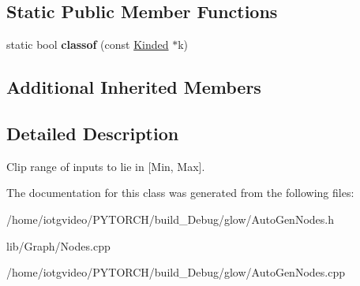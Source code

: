 \subsection*{Static Public Member Functions}
\begin{DoxyCompactItemize}
\item 
\mbox{\label{classglow_1_1_clip_node_aee9a7cb02ab0d44c7bf89635b13813dd}} 
static bool {\bfseries classof} (const \hyperlink{classglow_1_1_kinded}{Kinded} $\ast$k)
\end{DoxyCompactItemize}
\subsection*{Additional Inherited Members}


\subsection{Detailed Description}
Clip range of inputs to lie in \mbox{[}Min, Max\mbox{]}. 

The documentation for this class was generated from the following files\+:\begin{DoxyCompactItemize}
\item 
/home/iotgvideo/\+P\+Y\+T\+O\+R\+C\+H/build\+\_\+\+Debug/glow/Auto\+Gen\+Nodes.\+h\item 
lib/\+Graph/Nodes.\+cpp\item 
/home/iotgvideo/\+P\+Y\+T\+O\+R\+C\+H/build\+\_\+\+Debug/glow/Auto\+Gen\+Nodes.\+cpp\end{DoxyCompactItemize}
